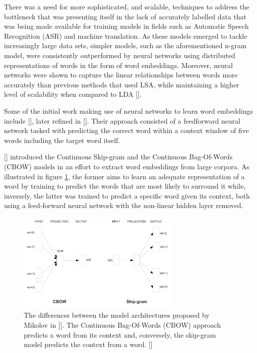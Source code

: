\documentclass[12pt, a4paper]{report}
\theoremstyle{definition}
\theoremstyle{definition}%
\theoremstyle{definition}%
\theoremstyle{definition}%
\theoremstyle{definition}%
\theoremstyle{definition}%
\renewcommand{\cite}[1]{[\citealp{#1}]}
\begin{document}
There was a need for more sophisticated, and scalable, techniques to address the bottleneck that was presenting itself in the lack of accurately labelled data that was being made available for training models in fields such as Automatic Speech Recognition (ASR) and machine translation. As these models emerged to tackle increasingly large data sets, simpler models, such as the aforementioned n-gram model, were consistently outperformed by neural networks using distributed representations of words in the form of word embeddings. Moreover, neural networks were shown to capture the linear relationships between words more accurately than previous methods that used LSA, while maintaining a higher level of scalability when compared to LDA \cite{mikolov2013}. 

Some of the initial work making use of neural networks to learn word embeddings include \cite{collobert2008}, later refined in \cite{collobert2011}. Their approach consisted of a feedforward neural network tasked with predicting the correct word within a context window of five words including the target word itself.

\cite{mikolov2013} introduced the Continuous Skip-gram and the Continuous Bag-Of-Words (CBOW) models in an effort to extract word embeddings from large corpora. As illustrated in figure \ref{fig:cbow_vs_skipgram}, the former aims to learn an adequate representation of a word by training to predict the words that are most likely to surround it while, inversely, the latter was trained to predict a specific word given its context, both using a feed-forward neural network with the non-linear hidden layer removed. 

\begin{figure}[!ht]
    \centering
    \includegraphics[width=0.7\textwidth]{fyp_template/figures/cbow_vs_skipgram.png}
    \caption{The differences between the model architectures proposed by Mikolov in \cite{mikolov2013}. The Continuous Bag-Of-Words (CBOW) approach predicts a word from its context and, conversely, the skip-gram model predicts the context from a word. \cite{mikolov2013b}}
    \label{fig:cbow_vs_skipgram}
\end{figure}
\end{document}
